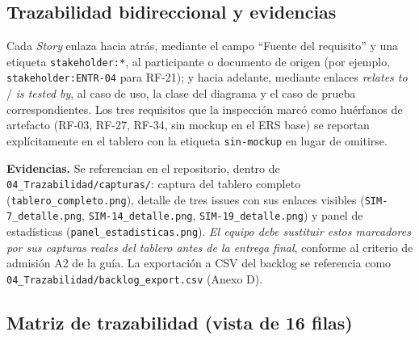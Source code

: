 \documentclass[11pt,a4paper]{article}
\begin{document}
\subsection{Trazabilidad bidireccional y evidencias}

Cada \emph{Story} enlaza hacia atrás, mediante el campo ``Fuente del requisito'' y una etiqueta
\texttt{stakeholder:*}, al participante o documento de origen (por ejemplo,
\texttt{stakeholder:ENTR-04} para RF-21); y hacia adelante, mediante enlaces \emph{relates to} /
\emph{is tested by}, al caso de uso, la clase del diagrama y el caso de prueba correspondientes.
Los tres requisitos que la inspección marcó como huérfanos de artefacto (RF-03, RF-27, RF-34, sin
mockup en el ERS base) se reportan explícitamente en el tablero con la etiqueta
\texttt{sin-mockup} en lugar de omitirse.

\noindent\textbf{Evidencias.} Se referencian en el repositorio, dentro de
\texttt{04\_Trazabilidad/capturas/}: captura del tablero completo
(\texttt{tablero\_completo.png}), detalle de tres issues con sus enlaces visibles
(\texttt{SIM-7\_detalle.png}, \texttt{SIM-14\_detalle.png}, \texttt{SIM-19\_detalle.png}) y panel
de estadísticas (\texttt{panel\_estadisticas.png}). \emph{El equipo debe sustituir estos
marcadores por sus capturas reales del tablero antes de la entrega final}, conforme al criterio
de admisión A2 de la guía. La exportación a CSV del backlog se referencia como
\texttt{04\_Trazabilidad/backlog\_export.csv} (Anexo D).

\subsection{Matriz de trazabilidad (vista de 16 filas)}
\end{document}
